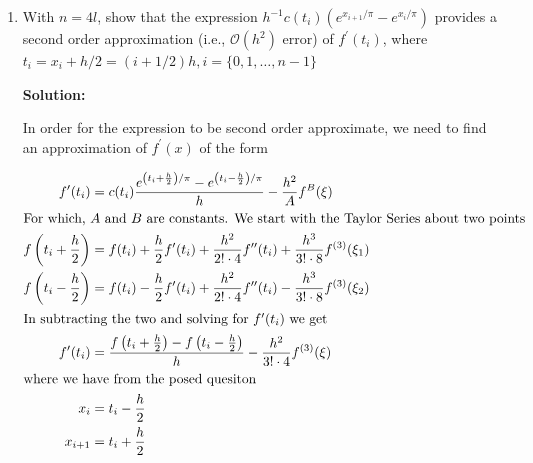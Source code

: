 \documentclass[12pt]{article}
\newcommand{\pprime}{\prime \prime}
\newcommand{\BigO}[1]{\mathcal{O}\left( #1 \right)}
\begin{document}
\begin{enumerate}
\begin{enumerate}
{\bf Solution:}

We can simply show what happens at one boundary point, and the same argument holds true for the other

\begin{align*}
\intertext{$j = 1$:}
0 \leq\ &x \leq \frac{1}{4}\pi\\
\intertext{$f(\pi/4) = e^{1/4}$}
\intertext{$j = 2$:}
\frac{1}{4}\pi \leq\ &x \leq \frac{2}{4}\pi
\end{align*}

Where the value at $f(\pi/4)$ is $2e^{1/4}$, so the boundary points are discontinuous, which is the reason we want to split the interval to subintervals in which the boundary points are where the function is discontinuous.

\item With $n = 4l$, show that the expression $h^{-1}c(t_{i})\left( e^{x_{i+1}/\pi} - e^{x_{i}/\pi}\right)$ provides a second order approximation (i.e., $\BigO{h^{2}}$ error) of $f^{\prime}(t_{i})$, where $t_{i} = x_{i} + h/2 = (i + 1/2)h, i = \{ 0, 1, \ldots, n-1\}$

{\bf Solution:}

In order for the expression to be second order approximate, we need to find an approximation of $f^{\prime}(x)$ of the form

\begin{align*}
f^{\prime}(t_{i}) &= c(t_{i})\frac{e^{\left(t_{i} + \frac{h}{2}\right)/\pi} - e^{\left(t_{i} - \frac{h}{2}\right)/\pi}}{h} - \frac{h^{2}}{A}f^{B}(\xi)\\
\intertext{For which, $A$ and $B$ are constants. We start with the Taylor Series about two points}
f\left( t_{i} + \frac{h}{2}\right) &= f(t_{i}) + \frac{h}{2}f^{\prime}(t_{i}) + \frac{h^{2}}{2!\cdot 4}f^{\pprime}(t_{i}) + \frac{h^{3}}{3!\cdot 8}f^{(3)}(\xi_{1})\\
f\left( t_{i} - \frac{h}{2}\right) &= f(t_{i}) - \frac{h}{2}f^{\prime}(t_{i}) + \frac{h^{2}}{2!\cdot 4}f^{\pprime}(t_{i}) - \frac{h^{3}}{3!\cdot 8}f^{(3)}(\xi_{2})\\
\intertext{In subtracting the two and solving for $f^{\prime}(t_{i})$ we get}
f^{\prime}(t_{i}) &= \frac{f\left( t_{i} + \frac{h}{2}\right) - f\left( t_{i} - \frac{h}{2}\right)}{h} - \frac{h^{2}}{3!\cdot 4}f^{(3)}(\xi)\\
\intertext{where we have from the posed quesiton}
x_{i} &= t_{i} - \frac{h}{2}\\
x_{i+1} &= t_{i} + \frac{h}{2}
\end{align*}


\end{enumerate}
\end{enumerate}
\end{document}
